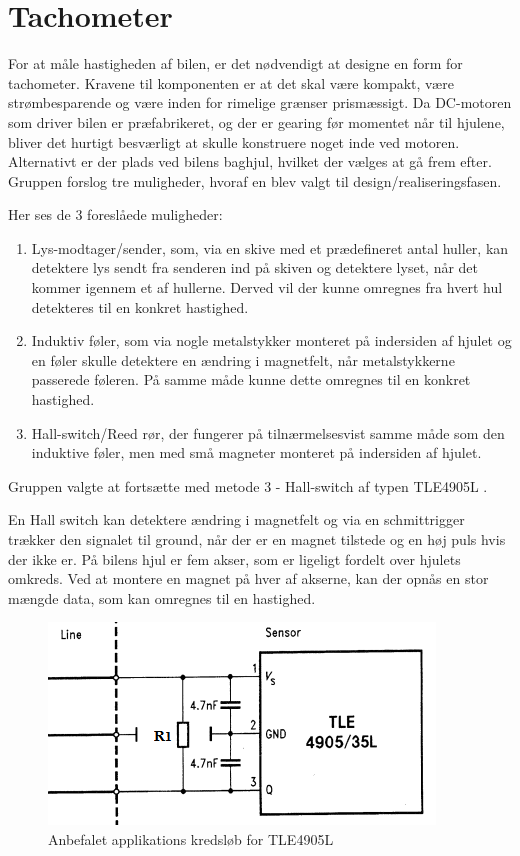 \section{Tachometer} \label{sub:systemarkitektur_tachometer}

For at måle hastigheden af bilen, er det nødvendigt at designe en form for tachometer. Kravene til komponenten er at det skal være kompakt, være strømbesparende og være inden for rimelige grænser prismæssigt. Da DC-motoren som driver bilen er præfabrikeret, og der er gearing før momentet når til hjulene, bliver det hurtigt besværligt at skulle konstruere noget inde ved motoren. Alternativt er der plads ved bilens baghjul, hvilket der vælges at gå frem efter. Gruppen forslog tre muligheder, hvoraf en blev valgt til design/realiseringsfasen.

Her ses de 3 foreslåede muligheder:

\begin{enumerate}
	\item Lys-modtager/sender, som, via en skive med et prædefineret antal huller, kan detektere lys sendt fra senderen ind på skiven og detektere lyset, når det kommer igennem et af hullerne. Derved vil der kunne omregnes fra hvert hul detekteres til en konkret hastighed.
	\item Induktiv føler, som via nogle metalstykker monteret på indersiden af hjulet og en føler skulle detektere en ændring i magnetfelt, når metalstykkerne passerede føleren. På samme måde kunne dette omregnes til en konkret hastighed.
	\item Hall-switch/Reed rør, der fungerer på tilnærmelsesvist samme måde som den induktive føler, men med små magneter monteret på indersiden af hjulet. 
\end{enumerate}

Gruppen valgte at fortsætte med metode 3 - Hall-switch af typen TLE4905L \cite{lib:tacho}. 

En Hall switch kan detektere ændring i magnetfelt og via en schmittrigger trækker den signalet til ground, når der er en magnet tilstede og en høj puls hvis der ikke er. På bilens hjul er fem akser, som er ligeligt fordelt over hjulets omkreds. Ved at montere en magnet på hver af akserne, kan der opnås en stor mængde data, som kan omregnes til en hastighed. 

\begin{figure}[h]
\centering
\includegraphics[scale=1]{../fig/billeder/tle4905L_application_circuit.png}
\caption{Anbefalet applikations kredsløb for TLE4905L}
\label{fig:tle4905L_app_circuit}
\end{figure}

